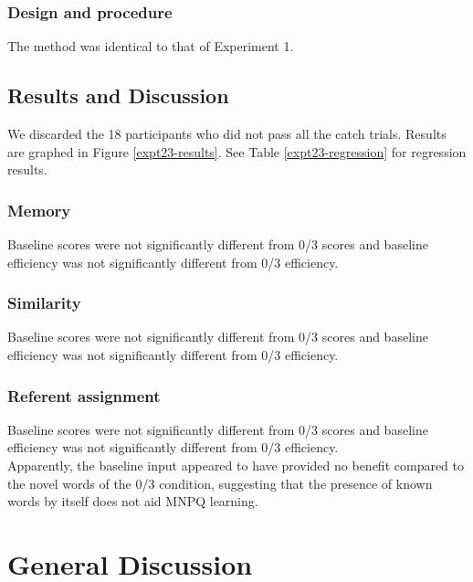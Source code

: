 \documentclass[man,floatsintext]{apa6}
\begin{document}
\subsubsection{Design and procedure}
The method was identical to that of Experiment 1.

\subsection{Results and Discussion}
We discarded the 18 participants who did not pass all the catch trials. Results are graphed in Figure \ref{expt23-results}. See Table \ref{expt23-regression} for regression results.

\subsubsection{Memory}
Baseline scores were not significantly different from 0/3 scores and baseline efficiency was not significantly different from 0/3 efficiency.

\subsubsection{Similarity}
Baseline scores were not significantly different from 0/3 scores and baseline efficiency was not significantly different from 0/3 efficiency.

\subsubsection{Referent assignment}
Baseline scores were not significantly different from 0/3 scores and baseline efficiency was not significantly different from 0/3 efficiency.\\

Apparently, the baseline input appeared to have provided no benefit compared to the novel words of the 0/3 condition, suggesting that the presence of known words by itself does not aid MNPQ learning.

\section{General Discussion}
\end{document}
